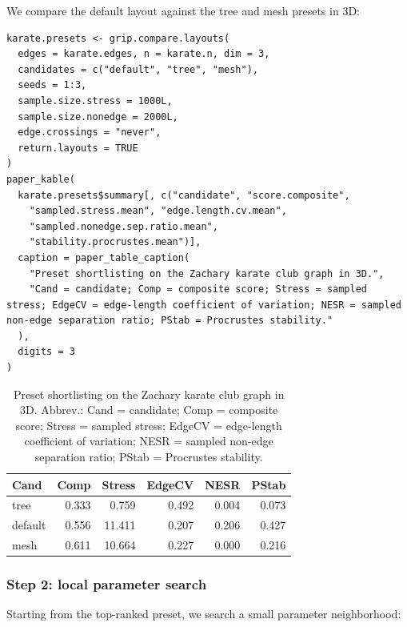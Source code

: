 We compare the default layout against the tree and mesh presets in 3D:

\begin{verbatim}
karate.presets <- grip.compare.layouts(
  edges = karate.edges, n = karate.n, dim = 3,
  candidates = c("default", "tree", "mesh"),
  seeds = 1:3,
  sample.size.stress = 1000L,
  sample.size.nonedge = 2000L,
  edge.crossings = "never",
  return.layouts = TRUE
)
paper_kable(
  karate.presets$summary[, c("candidate", "score.composite",
    "sampled.stress.mean", "edge.length.cv.mean",
    "sampled.nonedge.sep.ratio.mean",
    "stability.procrustes.mean")],
  caption = paper_table_caption(
    "Preset shortlisting on the Zachary karate club graph in 3D.",
    "Cand = candidate; Comp = composite score; Stress = sampled stress; EdgeCV = edge-length coefficient of variation; NESR = sampled non-edge separation ratio; PStab = Procrustes stability."
  ),
  digits = 3
)
\end{verbatim}

\begin{table}

\caption{\label{tab:unnamed-chunk-7}Preset shortlisting on the Zachary karate club graph in 3D. Abbrev.: Cand = candidate; Comp = composite score; Stress = sampled stress; EdgeCV = edge-length coefficient of variation; NESR = sampled non-edge separation ratio; PStab = Procrustes stability.}
\centering
\begin{tabular}[t]{l|r|r|r|r|r}
\hline
Cand & Comp & Stress & EdgeCV & NESR & PStab\\
\hline
tree & 0.333 & 0.759 & 0.492 & 0.004 & 0.073\\
\hline
default & 0.556 & 11.411 & 0.207 & 0.206 & 0.427\\
\hline
mesh & 0.611 & 10.664 & 0.227 & 0.000 & 0.216\\
\hline
\end{tabular}
\end{table}

\subsubsection{Step 2: local parameter search}\label{step-2-local-parameter-search}

Starting from the top-ranked preset, we search a small parameter neighborhood:

